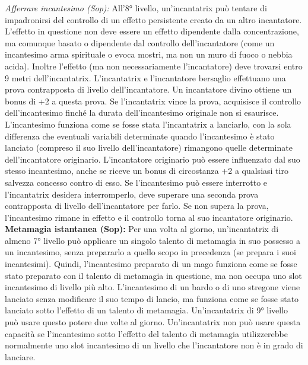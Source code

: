 \documentclass[10pt, a4paper]{report}
\begin{document}
\begin{multicols}{2}
\textit{Afferrare incantesimo (Sop):} All'8° livello, un'incantatrix può tentare di impadronirsi del controllo di un effetto persistente creato da un altro incantatore. L'effetto in questione non deve essere un effetto dipendente dalla concentrazione, ma comunque basato o dipendente dal controllo dell'incantatore (come un incantesimo arma spirituale o evoca mostri, ma non un muro di fuoco o nebbia acida). Inoltre l'effetto (ma non necessariamente l'incantatore) deve trovarsi entro 9 metri dell'incantatrix. L'incantatrix e l'incantatore bersaglio effettuano una prova contrapposta di livello dell'incantatore. Un incantatore divino ottiene un bonus di +2 a questa prova. Se l'incantatrix vince la prova, acquisisce il controllo dell'incantesimo finché la durata dell'incantesimo originale non si esaurisce. L'incantesimo funziona come se fosse stata l'incantatrix a lanciarlo, con la sola differenza che eventuali variabili determinate quando l'incantesimo è stato lanciato (compreso il suo livello dell'incantatore) rimangono quelle determinate dell'incantatore originario. L'incantatore originario può essere influenzato dal suo stesso incantesimo, anche se riceve un bonus di circostanza +2 a qualsiasi tiro salvezza concesso contro di esso. Se l'incantesimo può essere interrotto e l'incantatrix desidera interromperlo, deve superare una seconda prova contrapposta di livello dell'incantatore per farlo. Se non supera la prova, l'incantesimo rimane in effetto e il controllo torna al suo incantatore originario.\\

\textbf{Metamagia istantanea (Sop):} Per una volta al giorno, un'incantatrix di almeno 7° livello può applicare un singolo talento di metamagia in suo possesso a un incantesimo, senza prepararlo a quello scopo in precedenza (se prepara i suoi incantesimi). Quindi, l'incantesimo preparato di un mago funziona come se fosse stato preparato con il talento di metamagia in questione, ma non occupa uno slot incantesimo di livello più alto. L'incantesimo di un bardo o di uno stregone viene lanciato senza modificare il suo tempo di lancio, ma funziona come se fosse stato lanciato sotto l'effetto di un talento di metamagia. Un'incantatrix di 9° livello può usare questo potere due volte al giorno. Un'incantatrix non può usare questa capacità se l'incantesimo sotto l'effetto del talento di metamagia utilizzerebbe normalmente uno slot incantesimo di un livello che l'incantatore non è in grado di lanciare.\\


\end{multicols}
\end{document}
